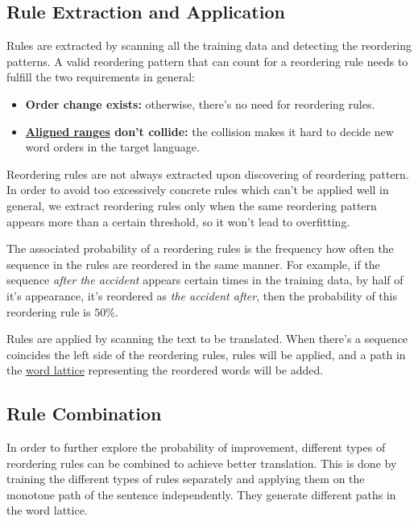 \subsection{Rule Extraction and Application}
\label{general}

Rules are extracted by scanning all the training data and detecting the reordering patterns. A valid reordering pattern that can count for a reordering rule needs to fulfill the two requirements in general:
\begin{itemize}
\setlength{\itemsep}{0cm}%
\setlength{\parskip}{0cm}%
\item \textbf{Order change exists:} otherwise, there's no need for reordering rules.
\item \textbf{\hyperref[alignedrange]{Aligned ranges} don't collide:} the collision makes it hard to decide new word orders in the target language.
\end{itemize}

Reordering rules are not always extracted upon discovering of reordering pattern. In order to avoid too excessively concrete rules which can't be applied well in general, we extract reordering rules only when the same reordering pattern appears more than a certain threshold, so it won't lead to overfitting.

The associated probability of a reordering rules is the frequency how often the sequence in the rules are reordered in the same manner. For example, if the sequence \emph{after the accident} appears certain times in the training data, by half of it's appearance, it's reordered as \emph{the accident after}, then the probability of this reordering rule is $50\%$.

Rules are applied by scanning the text to be translated. When there's a sequence coincides the left side of the reordering rules, rules will be applied, and a path in the \hyperref[ch:Foundations:sec:Lattices]{word lattice} representing the reordered words will be added.

\subsection{Rule Combination}

In order to further explore the probability of improvement, different types of reordering rules can be combined to achieve better translation. This is done by training the different types of rules separately and applying them on the monotone path of the sentence independently. They generate different paths in the word lattice.

